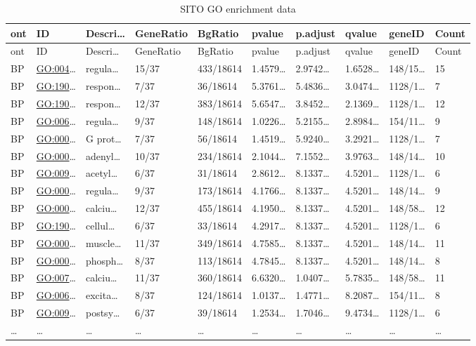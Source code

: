 \documentclass[
]{article}
\begin{document}
\begin{longtable}[]{@{}llllllllll@{}}
\caption{\label{tab:SITO-GO-enrichment-data}SITO GO enrichment data}\tabularnewline
\toprule
ont & ID & Descri\ldots{} & GeneRatio & BgRatio & pvalue & p.adjust & qvalue & geneID & Count\tabularnewline
\midrule
\endfirsthead
\toprule
ont & ID & Descri\ldots{} & GeneRatio & BgRatio & pvalue & p.adjust & qvalue & geneID & Count\tabularnewline
\midrule
\endhead
BP & \url{GO:004}\ldots{} & regula\ldots{} & 15/37 & 433/18614 & 1.4579\ldots{} & 2.9742\ldots{} & 1.6528\ldots{} & 148/15\ldots{} & 15\tabularnewline
BP & \url{GO:190}\ldots{} & respon\ldots{} & 7/37 & 36/18614 & 5.3761\ldots{} & 5.4836\ldots{} & 3.0474\ldots{} & 1128/1\ldots{} & 7\tabularnewline
BP & \url{GO:190}\ldots{} & respon\ldots{} & 12/37 & 383/18614 & 5.6547\ldots{} & 3.8452\ldots{} & 2.1369\ldots{} & 1128/1\ldots{} & 12\tabularnewline
BP & \url{GO:006}\ldots{} & regula\ldots{} & 9/37 & 148/18614 & 1.0226\ldots{} & 5.2155\ldots{} & 2.8984\ldots{} & 154/11\ldots{} & 9\tabularnewline
BP & \url{GO:000}\ldots{} & G prot\ldots{} & 7/37 & 56/18614 & 1.4519\ldots{} & 5.9240\ldots{} & 3.2921\ldots{} & 1128/1\ldots{} & 7\tabularnewline
BP & \url{GO:000}\ldots{} & adenyl\ldots{} & 10/37 & 234/18614 & 2.1044\ldots{} & 7.1552\ldots{} & 3.9763\ldots{} & 148/14\ldots{} & 10\tabularnewline
BP & \url{GO:009}\ldots{} & acetyl\ldots{} & 6/37 & 31/18614 & 2.8612\ldots{} & 8.1337\ldots{} & 4.5201\ldots{} & 1128/1\ldots{} & 6\tabularnewline
BP & \url{GO:000}\ldots{} & regula\ldots{} & 9/37 & 173/18614 & 4.1766\ldots{} & 8.1337\ldots{} & 4.5201\ldots{} & 148/14\ldots{} & 9\tabularnewline
BP & \url{GO:000}\ldots{} & calciu\ldots{} & 12/37 & 455/18614 & 4.1950\ldots{} & 8.1337\ldots{} & 4.5201\ldots{} & 148/58\ldots{} & 12\tabularnewline
BP & \url{GO:190}\ldots{} & cellul\ldots{} & 6/37 & 33/18614 & 4.2917\ldots{} & 8.1337\ldots{} & 4.5201\ldots{} & 1128/1\ldots{} & 6\tabularnewline
BP & \url{GO:000}\ldots{} & muscle\ldots{} & 11/37 & 349/18614 & 4.7585\ldots{} & 8.1337\ldots{} & 4.5201\ldots{} & 148/14\ldots{} & 11\tabularnewline
BP & \url{GO:000}\ldots{} & phosph\ldots{} & 8/37 & 113/18614 & 4.7845\ldots{} & 8.1337\ldots{} & 4.5201\ldots{} & 148/14\ldots{} & 8\tabularnewline
BP & \url{GO:007}\ldots{} & calciu\ldots{} & 11/37 & 360/18614 & 6.6320\ldots{} & 1.0407\ldots{} & 5.7835\ldots{} & 148/58\ldots{} & 11\tabularnewline
BP & \url{GO:006}\ldots{} & excita\ldots{} & 8/37 & 124/18614 & 1.0137\ldots{} & 1.4771\ldots{} & 8.2087\ldots{} & 154/11\ldots{} & 8\tabularnewline
BP & \url{GO:009}\ldots{} & postsy\ldots{} & 6/37 & 39/18614 & 1.2534\ldots{} & 1.7046\ldots{} & 9.4734\ldots{} & 1128/1\ldots{} & 6\tabularnewline
\ldots{} & \ldots{} & \ldots{} & \ldots{} & \ldots{} & \ldots{} & \ldots{} & \ldots{} & \ldots{} & \ldots{}\tabularnewline
\bottomrule
\end{longtable}
\end{document}
